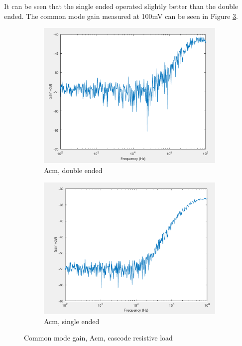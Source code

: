 It can be seen that the single ended operated slightly better than the double ended. The common mode gain measured at 100mV can be seen in Figure \ref{fig:Acmreslo}.

\begin{figure}[H]
    \centering
    \begin{subfigure}[b]{0.45\textwidth}
        \centering
        \includegraphics[width=\textwidth]{ExperimentalImplementation/Acm_100m_double.png}
        \caption{Acm, double ended}
        \label{fig:blue_led}
    \end{subfigure}
    \hfill
    \begin{subfigure}[b]{0.45\textwidth}
        \centering
        \includegraphics[width=\textwidth]{ExperimentalImplementation/Acm_100msingle.png}
        \caption{Acm, single ended}
        \label{fig:blue_led}
    \end{subfigure}
    \caption{Common mode gain, Acm, cascode resistive load}
    \label{fig:Acmreslo}
\end{figure} 

